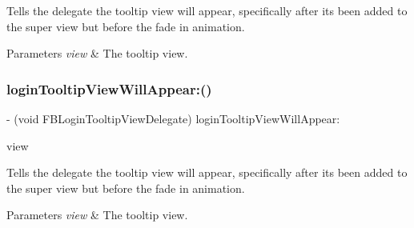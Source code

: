 Tells the delegate the tooltip view will appear, specifically after it\textquotesingle{}s been added to the super view but before the fade in animation.


\begin{DoxyParams}{Parameters}
{\em view} & The tooltip view. \\
\hline
\end{DoxyParams}
\mbox{\label{protocolFBLoginTooltipViewDelegate_01-p_a0d89efb9ebc19a9b47dd4116d5130631}} 
\subsubsection{\texorpdfstring{login\+Tooltip\+View\+Will\+Appear\+:()}{loginTooltipViewWillAppear:()}\hspace{0.1cm}{\footnotesize\ttfamily [2/5]}}
{\footnotesize\ttfamily -\/ (void F\+B\+Login\+Tooltip\+View\+Delegate) login\+Tooltip\+View\+Will\+Appear\+: \begin{DoxyParamCaption}\item[{(\hyperlink{interfaceFBLoginTooltipView}{F\+B\+Login\+Tooltip\+View} $\ast$)}]{view }\end{DoxyParamCaption}\hspace{0.3cm}{\ttfamily [optional]}}

Tells the delegate the tooltip view will appear, specifically after it\textquotesingle{}s been added to the super view but before the fade in animation.


\begin{DoxyParams}{Parameters}
{\em view} & The tooltip view. \\
\hline
\end{DoxyParams}
\mbox{\label{protocolFBLoginTooltipViewDelegate_01-p_a0d89efb9ebc19a9b47dd4116d5130631}} 
